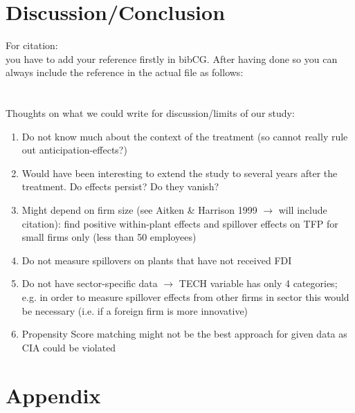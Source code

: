 \documentclass[a4paper,11pt]{scrartcl}
\newcommand{\sectionnumbering}[1]{%
  \setcounter{section}{0}%
   \renewcommand{\thesection}{\csname #1\endcsname{section}}}
\begin{document}
\section{Discussion/Conclusion}
For citation: \\
you have to add your reference firstly in bibCG. After having done so you can always include the reference in the actual file as follows: \\
 \citet{biddle1990sleep}\\
\citep[p.~35]{CaliendoHujerThomsen2008}	 \\


Thoughts on what we could write for discussion/limits of our study: 
\begin{enumerate}
\item Do not know much about the context of the treatment (so cannot really rule out anticipation-effects?)
\item Would have been interesting to extend the study to several years after the treatment. Do effects persist? Do they vanish? 
\item Might depend on firm size (see Aitken \& Harrison 1999 $\rightarrow$ will include citation): find positive within-plant effects and spillover effects on TFP for small firms only (less than 50 employees)
\item Do not measure spillovers on plants that have not received FDI
\item Do not have sector-specific data $\rightarrow$ TECH variable has only 4 categories; e.g. in order to measure spillover effects from other firms in sector this would be necessary (i.e. if a foreign firm is more innovative)
\item Propensity Score matching might not be the best approach for given data as CIA could be violated
\end{enumerate}


\newpage

 
\newpage



\section*{Appendix}
\sectionnumbering{Roman}
\setcounter{page}{3} %
\end{document}
